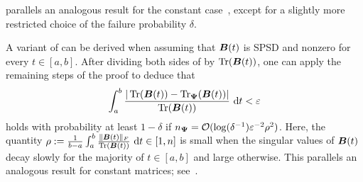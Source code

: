 %

 parallels an analogous result for the constant case~\cite[Lemma 2.1]{meyer-2021-hutch-optimal}, except for a slightly more restricted choice of the failure probability $\delta$.

\begin{remark}
    A variant of  can be derived when assuming that $\boldsymbol{B}(t)$ is SPSD and nonzero for every $t \in [a, b]$. After dividing both sides of  by $\operatorname{Tr}(\boldsymbol{B}(t))$, one can apply the remaining steps of the proof to deduce that
    \begin{equation*}
        \int_{a}^{b} \frac{| \operatorname{Tr}(\boldsymbol{B}(t)) - \operatorname{Tr}_{\boldsymbol{\Psi}}(\boldsymbol{B}(t)) |}{\operatorname{Tr}(\boldsymbol{B}(t))} ~\mathrm{d}t < \varepsilon
    \end{equation*}
    holds with probability at least $1 - \delta$ if $n_{\boldsymbol{\Psi}} = \mathcal{O}(\log(\delta^{-1}) \varepsilon^{-2} \rho^2)$. Here, 
    the quantity $
        \rho := \frac{1}{b-a} \int_{a}^{b} \frac{\lVert \boldsymbol{B}(t) \rVert _F}{\operatorname{Tr}(\boldsymbol{B}(t))} ~\mathrm{d}t \in [1,n]
    $
is small when the singular values of $\boldsymbol{B}(t)$ decay slowly for the majority of $t\in [a,b]$ and large otherwise. This parallels an analogous result for constant matrices; see~\cite[Remark 2]{cortinovis-2022-randomized-trace}.
\end{remark}

